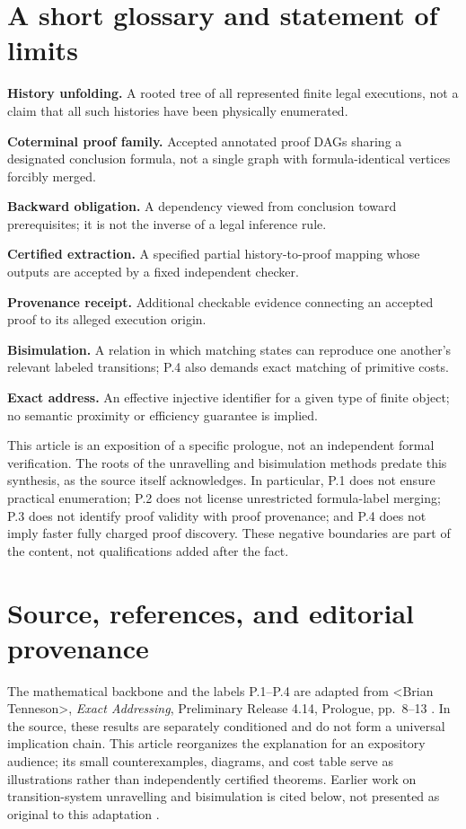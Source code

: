 \documentclass[11pt,letterpaper]{article}
\theoremstyle{plaincompact}
\newcommand{\anglename}{\textless{}Brian Tenneson\textgreater{}}
\begin{document}
\section{A short glossary and statement of limits}
\noindent\textbf{History unfolding.} A rooted tree of all represented finite legal executions, not a claim that all such histories have been physically enumerated.\par
\noindent\textbf{Coterminal proof family.} Accepted annotated proof DAGs sharing a designated conclusion formula, not a single graph with formula-identical vertices forcibly merged.\par
\noindent\textbf{Backward obligation.} A dependency viewed from conclusion toward prerequisites; it is not the inverse of a legal inference rule.\par
\noindent\textbf{Certified extraction.} A specified partial history-to-proof mapping whose outputs are accepted by a fixed independent checker.\par
\noindent\textbf{Provenance receipt.} Additional checkable evidence connecting an accepted proof to its alleged execution origin.\par
\noindent\textbf{Bisimulation.} A relation in which matching states can reproduce one another's relevant labeled transitions; P.4 also demands exact matching of primitive costs.\par
\noindent\textbf{Exact address.} An effective injective identifier for a given type of finite object; no semantic proximity or efficiency guarantee is implied.\par

\medskip
This article is an exposition of a specific prologue, not an independent formal verification. The roots of the unravelling and bisimulation methods predate this synthesis, as the source itself acknowledges. In particular, P.1 does not ensure practical enumeration; P.2 does not license unrestricted formula-label merging; P.3 does not identify proof validity with proof provenance; and P.4 does not imply faster fully charged proof discovery. These negative boundaries are part of the content, not qualifications added after the fact.

\section*{Source, references, and editorial provenance}
The mathematical backbone and the labels P.1--P.4 are adapted from \anglename, \emph{Exact Addressing}, Preliminary Release 4.14, Prologue, pp.~8--13 \cite{EA414}. In the source, these results are separately conditioned and do not form a universal implication chain. This article reorganizes the explanation for an expository audience; its small counterexamples, diagrams, and cost table serve as illustrations rather than independently certified theorems. Earlier work on transition-system unravelling and bisimulation is cited below, not presented as original to this adaptation \cite{Venema,JNW}.
\end{document}
